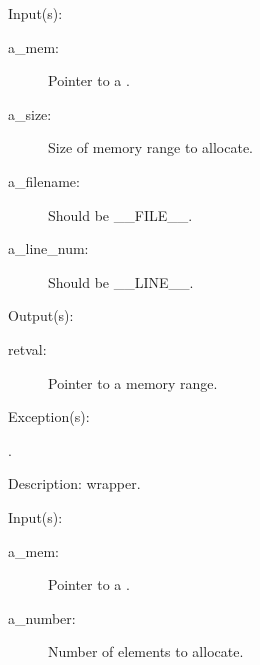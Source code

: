 \begin{capi}
\label{mem_malloc}
\label{_cw_malloc}
	\begin{capilist}
	\item[Input(s): ]
		\begin{description}\item[]
		\item[a\_mem: ]
			Pointer to a .
		\item[a\_size: ]
			Size of memory range to allocate.
		\item[a\_filename: ]
			Should be \_\_FILE\_\_.
		\item[a\_line\_num: ]
			Should be \_\_LINE\_\_.
		\end{description}
	\item[Output(s): ]
		\begin{description}\item[]
		\item[retval: ]
			Pointer to a memory range.
		\end{description}
	\item[Exception(s): ]
		\begin{description}\item[]
		\item[.]
		\end{description}
	\item[Description: ]
		 wrapper.
	\end{capilist}
\label{mem_calloc_e}
\label{mem_calloc}
\label{_cw_calloc}
	\begin{capilist}
	\item[Input(s): ]
		\begin{description}\item[]
		\item[a\_mem: ]
			Pointer to a \classname{mem}.
		\item[a\_number: ]
			Number of elements to allocate.

\end{description}
\end{capilist}
\end{capi}
